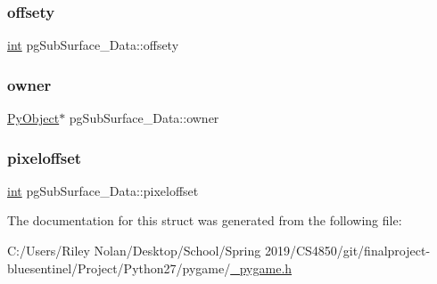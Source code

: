 \subsubsection{\texorpdfstring{offsety}{offsety}}
{\footnotesize\ttfamily \mbox{\hyperlink{warnings_8h_a74f207b5aa4ba51c3a2ad59b219a423b}{int}} pg\+Sub\+Surface\+\_\+\+Data\+::offsety}

\mbox{\label{structpg_sub_surface___data_aed9538cc59273069e75c874f499173dd}} 
\subsubsection{\texorpdfstring{owner}{owner}}
{\footnotesize\ttfamily \mbox{\hyperlink{_python27_2object_8h_aadc84ac7aed2cfa6f20c25f62bf3dac7}{Py\+Object}}$\ast$ pg\+Sub\+Surface\+\_\+\+Data\+::owner}

\mbox{\label{structpg_sub_surface___data_ada4c14cad4deb253defe94adb214e09b}} 
\subsubsection{\texorpdfstring{pixeloffset}{pixeloffset}}
{\footnotesize\ttfamily \mbox{\hyperlink{warnings_8h_a74f207b5aa4ba51c3a2ad59b219a423b}{int}} pg\+Sub\+Surface\+\_\+\+Data\+::pixeloffset}



The documentation for this struct was generated from the following file\+:\begin{DoxyCompactItemize}
\item 
C\+:/\+Users/\+Riley Nolan/\+Desktop/\+School/\+Spring 2019/\+C\+S4850/git/finalproject-\/bluesentinel/\+Project/\+Python27/pygame/\mbox{\hyperlink{__pygame_8h}{\+\_\+pygame.\+h}}\end{DoxyCompactItemize}
